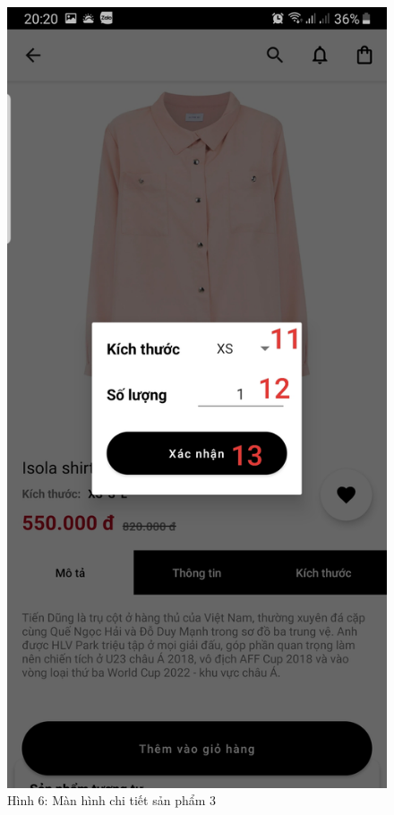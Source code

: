 \documentclass{beamer}
\begin{document}
\begin{frame}
    \begin{columns}
        \begin{figure}
            \centering
            \includegraphics[height=0.7\textheight]{images/04.png}
            \caption{\centering\tiny{Hình 6: Màn hình chi tiết sản phẩm 3}}


\end{figure}
\end{columns}
\end{frame}
\end{document}
